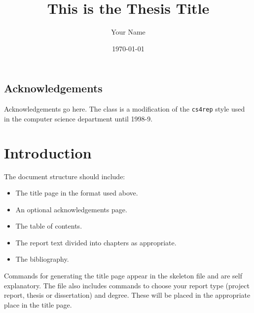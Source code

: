 \documentclass[parskip]{cs4rep}
\begin{document}
\title{This is the Thesis Title}
\author{Your Name}
\date{\today}


\maketitle

\section*{Acknowledgements}
Acknowledgements go here. 
The class is a modification of the {\tt cs4rep} style 
used in the computer science department until 1998-9.

\tableofcontents



\chapter{Introduction}

The document structure should include:
\begin{itemize}
\item
The title page  in the format used above.
\item
An optional acknowledgements page.
\item
The table of contents.
\item
The report text divided into chapters as appropriate.
\item
The bibliography.
\end{itemize}

Commands for generating the title page appear in the skeleton file and
are self explanatory.
The file also includes commands to choose your report type (project
report, thesis or dissertation) and degree.
These will be placed in the appropriate place in the title page. 
\end{document}
